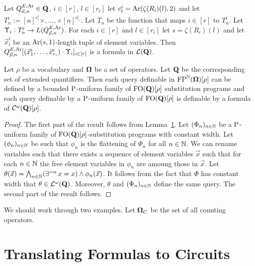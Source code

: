 \documentclass[../main/thesis.tex]{subfiles}
\begin{document}
\begin{textbox}[14.0cm]
  Let $Q^{E, \text{\upshape Ar}}_{\vec{a}, n} \in \mathbf{Q}$, $i \in [r]$, $l \in [r_i]$ let
  $c^i_l = \text{\upshape Ar}(\zeta(R_i)(l), 2)$ and let $T^i_n := [n]^{c^i_l} \times , \ldots,
  \times [n]^{c^i_{r_i}}$. Let $T_n$ be the function that maps $i \in [r]$ to
  $T^i_n$. Let $\Upsilon_i : T^i_n \rightarrow L(Q^{E, \text{\upshape Ar}}_{\vec{p}, n})$. For each $i
  \in [r]$ and $l \in [r_i]$ let $s = \zeta (R_i)(l)$ and let $\vec{x}^i_l$ be
  an $\text{\upshape Ar}(s, 1)$-length tuple of element variables. Then $Q^{E, \text{\upshape Ar}}_{\vec{p},
    n} [(\vec{x}^i_1, \ldots, \vec{x}^i_{r_i}) \cdot \Upsilon_i]_{i \in [r]}$ is
  a formula in $\mathcal{L}(\mathbf{Q})$.
\end{textbox}

\begin{prop}
  Let $\rho$ be a vocabulary and $\mathbf{\mathbf{\Omega}}$ be a set of operators. Let $\mathbf{Q}$
  be the corresponding set of extended quantifiers. Then each query definable in
  $\text{\upshape FP}^{\mathbb{N}}(\mathbf{\mathbf{\Omega}})[\rho]$ can be defined by a bounded $\mathrm{P}$-uniform family
  of $\text{\upshape FO}(\mathbf{Q})[\rho]$ substitution programs and each query definable by a
  $\mathrm{P}$-uniform family of $\text{\upshape FO}(\mathbf{Q})[\rho]$ is definable by a formula of
  $\mathcal{C}^{\omega}(\mathbf{Q})[\rho]$.
\end{prop}
\begin{proof}
  The first part of the result follows from Lemma~\ref{}. Let $(\Phi_n)_{n \in
    \mathbb{N}}$ be a $\mathrm{P}$-uniform family of $\text{\upshape FO}(\mathbf{Q})[\rho]$-substitution
  programs with constant width. Let $(\phi_n)_{n \in \mathbb{N}}$ be such that
  $\phi_n$ is the flattening of $\Phi_n$ for all $n \in \mathbb{N}$. We can rename
  variables such that there exists a sequence of element variables $\vec{x}$
  such that for each $n \in \mathbb{N}$ the free element variables in $\phi_n$ are
  amoung those in $\vec{x}$. Let $\theta (\vec{x}) = \bigwedge_{n \in \mathbb{N}}
  (\exists^{=n} \, x = x) \land \phi_n (\vec{x})$. It follows from the fact that
  $\Phi$ has constant width that $\theta \in \mathcal{L}^\omega(\mathbf{Q})$.
  Moreover, $\theta$ and $(\Phi_n)_{n \in \mathbb{N}}$ define the same query. The
  second part of the result follows.
\end{proof}

We should work through two examples. Let $\mathbf{\mathbf{\Omega}}_C$ be the set of all counting
operators.

\section{Translating Formulas to Circuits}
\end{document}

